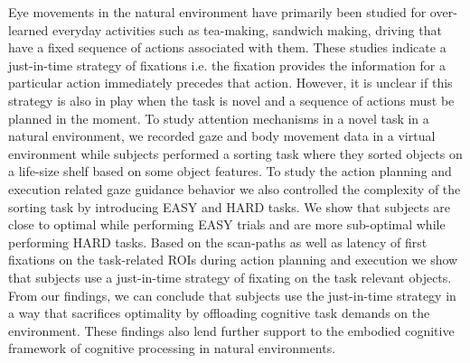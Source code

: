 Eye movements in the natural environment have primarily been studied for over-learned everyday activities such as tea-making, sandwich making, driving that have a fixed sequence of actions associated with them. These studies indicate a just-in-time strategy of fixations i.e. the fixation provides the  information  for  a  particular  action  immediately precedes that action. However, it is unclear if this strategy is also in play when the task is novel and a sequence of actions must be planned in the moment. To study attention mechanisms in a novel task in a natural environment, we recorded gaze and body movement data in a virtual environment while subjects performed a sorting task where they sorted objects on a life-size shelf based on some object features. To study the action planning and execution related gaze guidance behavior we also controlled the complexity of the sorting task by introducing EASY and HARD tasks. We show that subjects are close to optimal while performing EASY trials and are more sub-optimal while performing HARD tasks. Based on the scan-paths as well as latency of first fixations on the task-related ROIs during action planning and execution we show that subjects use a just-in-time strategy of fixating on the task relevant objects. From our findings, we can conclude that subjects use the just-in-time strategy in a way that sacrifices optimality by offloading cognitive task demands on the environment. These findings also lend further support to the embodied cognitive framework of cognitive processing in natural environments.